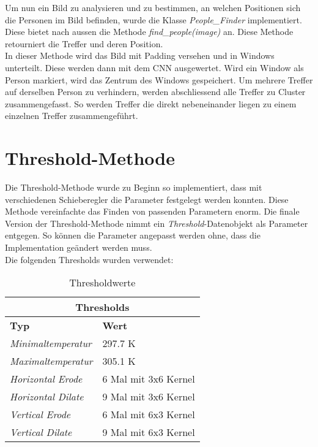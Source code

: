 Um nun ein Bild zu analysieren und zu bestimmen, an welchen Positionen sich die Personen im Bild befinden, wurde die Klasse \textit{People\_Finder} implementiert. Diese bietet nach aussen die Methode \textit{find\_people(image)} an. Diese Methode retourniert die Treffer und deren Position.\\
In dieser Methode wird das Bild mit \gls{Padding} versehen und in \glspl{Window} unterteilt. Diese werden dann mit dem \gls{CNN} ausgewertet. Wird ein \gls{Window} als Person markiert, wird das Zentrum des \glspl{Window} gespeichert. Um mehrere Treffer auf derselben Person zu verhindern, werden abschliessend alle Treffer zu \gls{Cluster} zusammengefasst. So werden Treffer die direkt nebeneinander liegen zu einem einzelnen Treffer zusammengeführt.

\section{Threshold-Methode}

Die Threshold-Methode wurde zu Beginn so implementiert, dass mit verschiedenen Schieberegler die Parameter festgelegt werden konnten. Diese Methode vereinfachte das Finden von passenden Parametern enorm. Die finale Version der Threshold-Methode nimmt ein \textit{Threshold}-Datenobjekt als Parameter entgegen. So können die Parameter angepasst werden ohne, dass die Implementation geändert werden muss.\\
Die folgenden Thresholds wurden verwendet:

{
	\renewcommand{\arraystretch}{1.3}

	\begin{table}[H]
		\scriptsize
		\centering
		\begin{tabularx}{.6\textwidth}{XX}\\
			\multicolumn{2}{c}{\textbf{Thresholds}}\\
			\hline
			\textbf{Typ} & \textbf{Wert}\\
			\hline
			\textit{Minimaltemperatur} & 297.7 K\\
			\hline
			\textit{Maximaltemperatur} & 305.1 K\\
			\hline 
			\textit{Horizontal \gls{Erode}} & 6 Mal mit 3x6 Kernel\\
			\hline
			\textit{Horizontal \gls{Dilate}} & 9 Mal mit 3x6 Kernel\\
			\hline
			\textit{Vertical \gls{Erode}} & 6 Mal mit 6x3 Kernel\\
			\hline
			\textit{Vertical \gls{Dilate}} & 9  Mal mit 6x3 Kernel\\
			\hline
		\end{tabularx}
		\caption{Thresholdwerte}
		\label{tbl:thresholds}
	\end{table}
}

